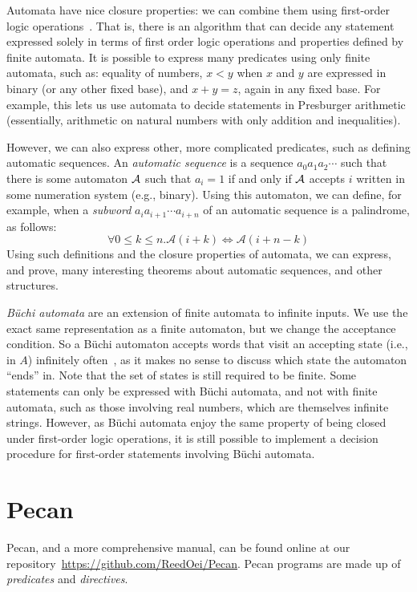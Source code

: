 \documentclass[10pt,usenames,dvipsnames]{article}
\begin{document}
Automata have nice closure properties: we can combine them using first-order logic operations~\cite{aut_theory}.
That is, there is an algorithm that can decide any statement expressed solely in terms of first order logic operations and properties defined by finite automata.
It is possible to express many predicates using only finite automata, such as: equality of numbers, $x < y$ when $x$ and $y$ are expressed in binary (or any other fixed base), and $x + y = z$, again in any fixed base.
For example, this lets us use automata to decide statements in Presburger arithmetic (essentially, arithmetic on natural numbers with only addition and inequalities).

However, we can also express other, more complicated predicates, such as defining automatic sequences.
An \emph{automatic sequence} is a sequence $a_0 a_1 a_2 \cdots$ such that there is some automaton $\cal A$ such that $a_i = 1$ if and only if $\cal A$ accepts $i$ written in some numeration system (e.g., binary).
Using this automaton, we can define, for example, when a \emph{subword} $a_i a_{i+1} \cdots a_{i+n}$ of an automatic sequence is a palindrome, as follows:
\[
    \forall 0 \leq k \leq n. \mathcal{A}(i + k) \iff \mathcal{A}(i + n - k)
\]
Using such definitions and the closure properties of automata, we can express, and prove, many interesting theorems about automatic sequences, and other structures.

\emph{B\"uchi automata} are an extension of finite automata to infinite inputs.
We use the exact same representation as a finite automaton, but we change the acceptance condition.
So a B\"uchi automaton accepts words that visit an accepting state (i.e., in $A$) infinitely often~\cite{aut_theory}, as it makes no sense to discuss which state the automaton ``ends'' in.
Note that the set of states is still required to be finite.
Some statements can only be expressed with B\"uchi automata, and not with finite automata, such as those involving real numbers, which are themselves infinite strings.
However, as B\"uchi automata enjoy the same property of being closed under first-order logic operations, it is still possible to implement a decision procedure for first-order statements involving B\"uchi automata.

\section{Pecan}

Pecan, and a more comprehensive manual, can be found online at our repository~\url{https://github.com/ReedOei/Pecan}.
Pecan programs are made up of \emph{predicates} and \emph{directives}.
\end{document}
